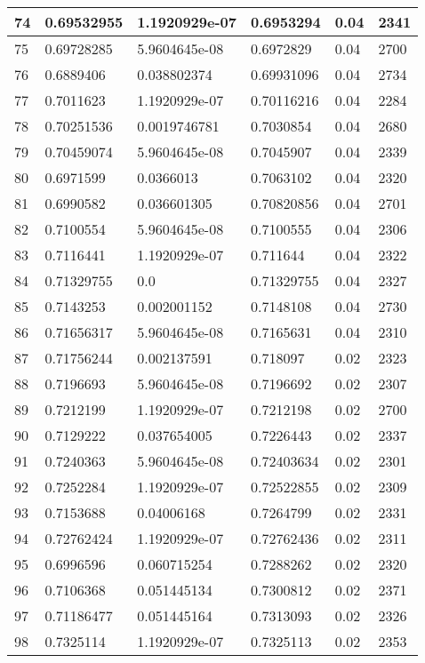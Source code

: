 \begin{longtable}{|l|l|l|l|l|l|}
74 & 0.69532955 & 1.1920929e-07 & 0.6953294 & 0.04 & 2341 \\ \hline 
75 & 0.69728285 & 5.9604645e-08 & 0.6972829 & 0.04 & 2700 \\ \hline 
76 & 0.6889406 & 0.038802374 & 0.69931096 & 0.04 & 2734 \\ \hline 
77 & 0.7011623 & 1.1920929e-07 & 0.70116216 & 0.04 & 2284 \\ \hline 
78 & 0.70251536 & 0.0019746781 & 0.7030854 & 0.04 & 2680 \\ \hline 
79 & 0.70459074 & 5.9604645e-08 & 0.7045907 & 0.04 & 2339 \\ \hline 
80 & 0.6971599 & 0.0366013 & 0.7063102 & 0.04 & 2320 \\ \hline 
81 & 0.6990582 & 0.036601305 & 0.70820856 & 0.04 & 2701 \\ \hline 
82 & 0.7100554 & 5.9604645e-08 & 0.7100555 & 0.04 & 2306 \\ \hline 
83 & 0.7116441 & 1.1920929e-07 & 0.711644 & 0.04 & 2322 \\ \hline 
84 & 0.71329755 & 0.0 & 0.71329755 & 0.04 & 2327 \\ \hline 
85 & 0.7143253 & 0.002001152 & 0.7148108 & 0.04 & 2730 \\ \hline 
86 & 0.71656317 & 5.9604645e-08 & 0.7165631 & 0.04 & 2310 \\ \hline 
87 & 0.71756244 & 0.002137591 & 0.718097 & 0.02 & 2323 \\ \hline 
88 & 0.7196693 & 5.9604645e-08 & 0.7196692 & 0.02 & 2307 \\ \hline 
89 & 0.7212199 & 1.1920929e-07 & 0.7212198 & 0.02 & 2700 \\ \hline 
90 & 0.7129222 & 0.037654005 & 0.7226443 & 0.02 & 2337 \\ \hline 
91 & 0.7240363 & 5.9604645e-08 & 0.72403634 & 0.02 & 2301 \\ \hline 
92 & 0.7252284 & 1.1920929e-07 & 0.72522855 & 0.02 & 2309 \\ \hline 
93 & 0.7153688 & 0.04006168 & 0.7264799 & 0.02 & 2331 \\ \hline 
94 & 0.72762424 & 1.1920929e-07 & 0.72762436 & 0.02 & 2311 \\ \hline 
95 & 0.6996596 & 0.060715254 & 0.7288262 & 0.02 & 2320 \\ \hline 
96 & 0.7106368 & 0.051445134 & 0.7300812 & 0.02 & 2371 \\ \hline 
97 & 0.71186477 & 0.051445164 & 0.7313093 & 0.02 & 2326 \\ \hline 
98 & 0.7325114 & 1.1920929e-07 & 0.7325113 & 0.02 & 2353 \\ \hline 

\end{longtable}

